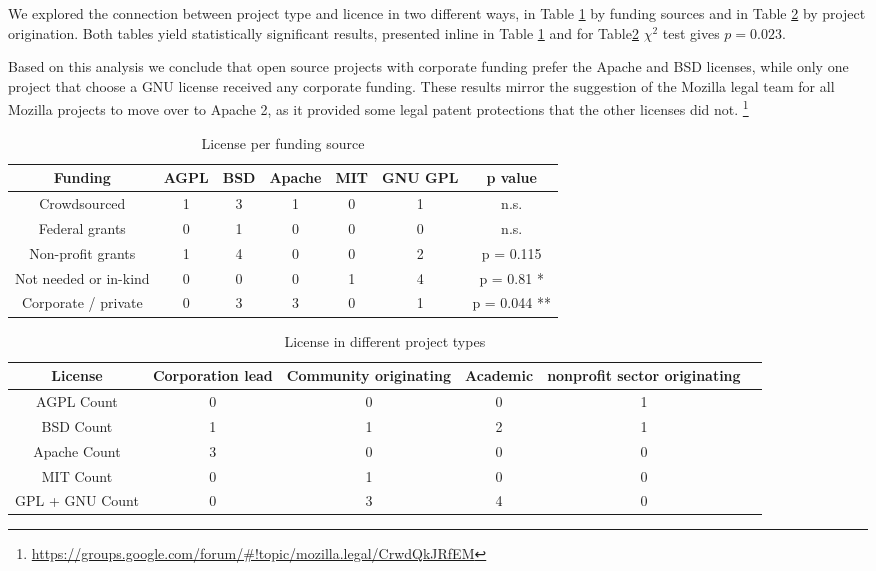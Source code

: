 We explored the connection between project type and licence in two different ways, in Table \ref{tab:licence_per_fudning} by funding sources and in Table \ref{tab:licence_per_project_type} by project origination. Both tables yield statistically significant results, presented inline in Table \ref{tab:licence_per_fudning} and for Table\ref{tab:licence_per_project_type} $\chi^2$ test gives $p=0.023$.

Based on this analysis we conclude that open source projects with corporate funding prefer the Apache and BSD licenses, while only one project that choose a GNU license received any corporate funding. These results mirror the suggestion of the Mozilla legal team for all Mozilla projects to move over to Apache 2, as it provided some legal patent protections that the other licenses did not. \footnote{\url{https://groups.google.com/forum/#!topic/mozilla.legal/CrwdQkJRfEM}}

\begin{table}[htbp]
  \centering
  \caption{License per funding source}
    \begin{tabular}{|c|c|c|c|c|c|c|}
    \hline
         Funding & AGPL  & BSD   & Apache & MIT   & GNU GPL & p value \\
\hline
    Crowdsourced & 1     & 3     & 1     & 0     & 1     & n.s. \\
    Federal grants & 0     & 1     & 0     & 0     & 0     & n.s. \\
    Non-profit grants & 1     & 4     & 0     & 0     & 2     & p = 0.115 \\
    Not needed or in-kind & 0     & 0     & 0     & 1     & 4     & p = 0.81 * \\
    Corporate / private & 0     & 3     & 3     & 0     & 1     & p = 0.044 ** \\
\hline    
    \end{tabular}
  \label{tab:licence_per_fudning}
\end{table}

\begin{table}[htbp]
  \centering
  \caption{License in different project types}
    \begin{tabular}{|c|c|c|c|c|c|}
	\hline
          License & Corporation lead & Community originating & Academic & nonprofit sector originating \\
    \hline
    AGPL Count & 0     & 0     & 0     & 1 \\
    BSD  Count & 1     & 1     & 2     & 1 \\
    Apache Count & 3     & 0     & 0     & 0 \\
    MIT  Count & 0     & 1     & 0     & 0 \\
    GPL + GNU Count & 0     & 3     & 4     & 0 \\
    \hline
    \end{tabular}
  \label{tab:licence_per_project_type}
\end{table}%

